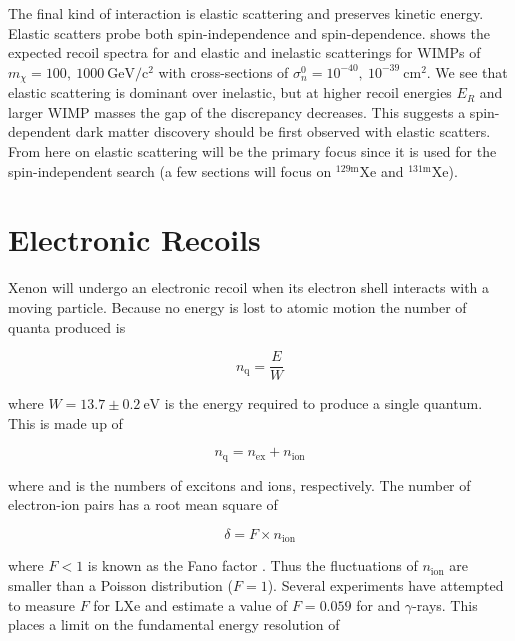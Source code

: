 The final kind of interaction is elastic scattering and preserves kinetic energy.  Elastic scatters probe both spin-independence
and spin-dependence.   shows the expected recoil spectra for  and
 elastic and
inelastic scatterings for WIMPs of $m_{\chi} = 100,\ 1000\ \mathrm{GeV/c^2}$ with cross-sections of
$\sigma_{n}^{0} = 10^{-40},\ 10^{-39}\ \mathrm{cm^{2}}$.  We see that elastic scattering is dominant over inelastic, but at higher recoil
energies $E_{R}$ and larger WIMP masses the gap of the discrepancy decreases.  This suggests a spin-dependent dark matter discovery should
be first observed with elastic scatters.  From here on elastic scattering will be the primary focus since it is used for the
spin-independent search (a few sections will focus on $\mathrm{^{129m}Xe}$ and $\mathrm{^{131m}Xe}$).


\section{Electronic Recoils}
\label{sec:er}
Xenon will undergo an electronic recoil when its electron shell interacts with a moving particle.  Because no energy
is lost to atomic motion the number of quanta produced is

\begin{equation}
n_{\mathrm{q}} = \frac{E}{W}
\label{eq:nquant_er}
\end{equation}

\noindent where $W = 13.7 \pm 0.2\ \mathrm{eV}$  is the energy required to produce a single quantum.  This is made up
of

\begin{equation}
n_{\mathrm{q}} = n_{\mathrm{ex}} + n_{\mathrm{ion}}
\label{eq:quanta}
\end{equation}

\noindent where \nex and \nion is the numbers of excitons and ions, respectively.  The number of electron-ion pairs has a root mean square
of

\begin{equation}
\delta = F \times n_{\mathrm{ion}}
\label{eq:fano}
\end{equation}

\noindent where $F < 1$ is known as the Fano factor .  Thus the fluctuations of $n_{\mathrm{ion}}$ are smaller than a
Poisson distribution ($F = 1$).  Several experiments have attempted to measure $F$ for LXe  and
estimate a value of $F = 0.059$ for \electron and $\gamma$-rays.  This places a limit on the fundamental energy resolution of

